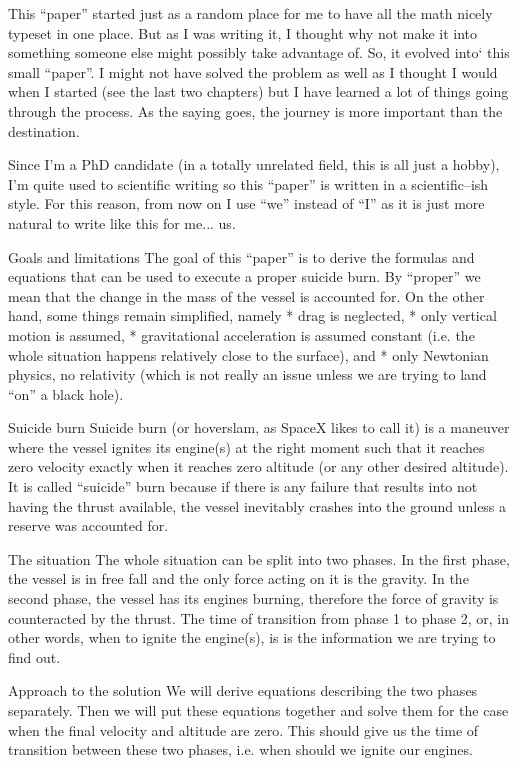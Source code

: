 This ``paper'' started just as a random place for me to have all the math nicely typeset in one place.
But as I was writing it, I thought why not make it into something someone else might possibly take advantage of.
So, it evolved into` this small ``paper''.
I might not have solved the problem as well as I thought I would when I started (see the last two chapters) but I have learned a lot of things going through the process.
As the saying goes, the journey is more important than the destination.

Since I'm a PhD candidate (in a totally unrelated field, this is all just a hobby), I'm quite used to scientific writing so this ``paper'' is written in a scientific--ish style.
For this reason, from now on I use ``we'' instead of ``I'' as it is just more natural to write like this for me... us.

\sec Goals and limitations
The goal of this ``paper'' is to derive the formulas and equations that can be used to execute a proper suicide burn.
By ``proper'' we mean that the change in the mass of the vessel is accounted for.
On the other hand, some things remain simplified, namely
\begitems
    * drag is neglected,
    * only vertical motion is assumed,
    * gravitational acceleration is assumed constant (i.e. the whole situation happens relatively close to the surface), and
    * only Newtonian physics, no relativity (which is not really an issue unless we are trying to land ``on'' a black hole).
\enditems

\sec Suicide burn
Suicide burn (or hoverslam, as SpaceX likes to call it) is a maneuver where the vessel ignites its engine(s) at the right moment such that it reaches zero velocity exactly when it reaches zero altitude (or any other desired altitude).
It is called ``suicide'' burn because if there is any failure that results into not having the thrust available, the vessel inevitably crashes into the ground unless a reserve was accounted for.

\sec The situation
The whole situation can be split into two phases.
In the first phase, the vessel is in free fall and the only force acting on it is the gravity.
In the second phase, the vessel has its engines burning, therefore the force of gravity is counteracted by the thrust.
The time of transition from phase 1 to phase 2, or, in other words, when to ignite the engine(s), is is the information we are trying to find out.

\sec Approach to the solution
We will derive equations describing the two phases separately.
Then we will put these equations together and solve them for the case when the final velocity and altitude are zero.
This should give us the time of transition between these two phases, i.e. when should we ignite our engines.

